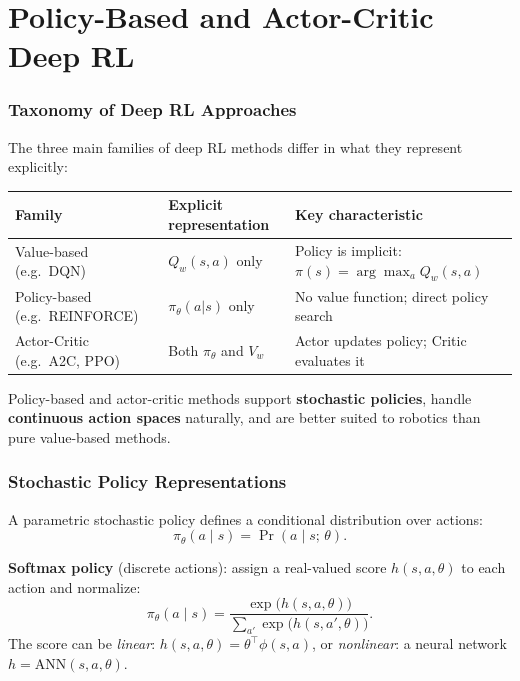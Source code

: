 \documentclass[11pt,a4paper]{article}
\theoremstyle{definition}
\theoremstyle{plain}
\theoremstyle{remark}
\begin{document}
\part{Policy-Based and Actor-Critic Deep RL}

\section{Taxonomy of Deep RL Approaches}

The three main families of deep RL methods differ in what they represent explicitly:

\begin{center}
\begin{tabular}{lll}
\hline
\textbf{Family} & \textbf{Explicit representation} & \textbf{Key characteristic} \\
\hline
Value-based (e.g.\ DQN)   & $Q_w(s,a)$ only           & Policy is implicit: $\pi(s) = \arg\max_a Q_w(s,a)$ \\
Policy-based (e.g.\ REINFORCE) & $\pi_\theta(a|s)$ only & No value function; direct policy search \\
Actor-Critic (e.g.\ A2C, PPO)  & Both $\pi_\theta$ and $V_w$ & Actor updates policy; Critic evaluates it \\
\hline
\end{tabular}
\end{center}

Policy-based and actor-critic methods support \textbf{stochastic policies}, handle \textbf{continuous action spaces} naturally, and are better suited to robotics than pure value-based methods.

\section{Stochastic Policy Representations}

A parametric stochastic policy defines a conditional distribution over actions:
\[
    \pi_\theta(a \mid s) = \Pr(a \mid s;\, \theta).
\]

\textbf{Softmax policy} (discrete actions): assign a real-valued score $h(s,a,\theta)$ to each action and normalize:
\[
    \pi_\theta(a \mid s) = \frac{\exp\bigl(h(s,a,\theta)\bigr)}{\displaystyle\sum_{a'}\exp\bigl(h(s,a',\theta)\bigr)}.
\]
The score can be \emph{linear}: $h(s,a,\theta) = \theta^\top \phi(s,a)$, or \emph{nonlinear}: a neural network $h = \mathrm{ANN}(s,a,\theta)$.
\end{document}
